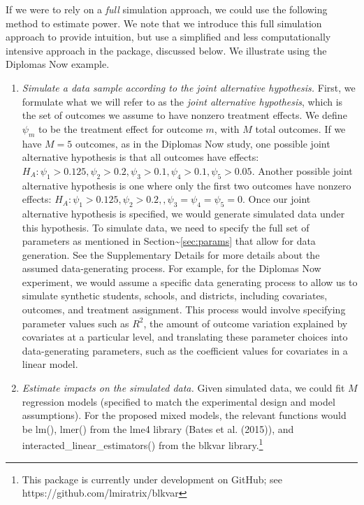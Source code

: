 \documentclass[
]{article}
\begin{document}
If we were to rely on a \emph{full} simulation approach, we could use
the following method to estimate power. We note that we introduce this
full simulation approach to provide intuition, but use a simplified and
less computationally intensive approach in the package, discussed below.
We illustrate using the Diplomas Now example.

\begin{enumerate}
\def\labelenumi{\arabic{enumi}.}
\item
  \emph{Simulate a data sample according to the joint alternative
  hypothesis.} First, we formulate what we will refer to as the
  \emph{joint alternative hypothesis}, which is the set of outcomes we
  assume to have nonzero treatment effects. We define \(\psi_m\) to be
  the treatment effect for outcome \(m\), with \(M\) total outcomes. If
  we have \(M = 5\) outcomes, as in the Diplomas Now study, one possible
  joint alternative hypothesis is that all outcomes have effects:
  \(H_A: \psi_1 > 0.125, \psi_2 > 0.2, \psi_3 > 0.1, \psi_4 > 0.1, \psi_5 > 0.05\).
  Another possible joint alternative hypothesis is one where only the
  first two outcomes have nonzero effects:
  \(H_A: \psi_1 > 0.125, \psi_2 > 0.2,, \psi_3 = \psi_4 = \psi_5 = 0\).
  Once our joint alternative hypothesis is specified, we would generate
  simulated data under this hypothesis. To simulate data, we need to
  specify the full set of parameters as mentioned in
  Section\textasciitilde{}\ref{sec:params} that allow for data
  generation. See the Supplementary Details for more details about the
  assumed data-generating process. For example, for the Diplomas Now
  experiment, we would assume a specific data generating process to
  allow us to simulate synthetic students, schools, and districts,
  including covariates, outcomes, and treatment assignment. This process
  would involve specifying parameter values such as \(R^2\), the amount
  of outcome variation explained by covariates at a particular level,
  and translating these parameter choices into data-generating
  parameters, such as the coefficient values for covariates in a linear
  model.
\item
  \emph{Estimate impacts on the simulated data.} Given simulated data,
  we could fit \(M\) regression models (specified to match the
  experimental design and model assumptions). For the proposed mixed
  models, the relevant functions would be lm(), lmer() from the lme4
  library (Bates et al. (2015)), and interacted\_linear\_estimators()
  from the blkvar
  library.\footnote{This package is currently under development on GitHub; see https://github.com/lmiratrix/blkvar}

\end{enumerate}
\end{document}
